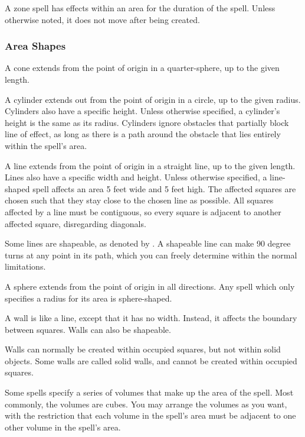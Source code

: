  A zone spell has effects within an area for the duration of the spell. Unless otherwise noted, it does not move after being created.

\subsubsection{Area Shapes}

 A cone extends from the point of origin in a quarter-sphere, up to the given length.

 A cylinder extends out from the point of origin in a circle, up to the given radius. Cylinders also have a specific height. Unless otherwise specified, a cylinder's height is the same as its radius. Cylinders ignore obstacles that partially block line of effect, as long as there is a path around the obstacle that lies entirely within the spell's area.

 A line extends from the point of origin in a straight line, up to the given length. Lines also have a specific width and height. Unless otherwise specified, a line-shaped spell affects an area 5 feet wide and 5 feet high. The affected squares are chosen such that they stay close to the chosen line as possible. All squares affected by a line must be contiguous, so every square is adjacent to another affected square, disregarding diagonals.

\label{Shapeable} Some lines are shapeable, as denoted by \shapeable. A shapeable line can make 90 degree turns at any point in its path, which you can freely determine within the normal limitations.

 A sphere extends from the point of origin in all directions. Any spell which only specifies a radius for its area is sphere-shaped.

 A wall is like a line, except that it has no width. Instead, it affects the boundary between squares. Walls can also be shapeable.

Walls can normally be created within occupied squares, but not within solid objects. Some walls are called solid walls, and cannot be created within occupied squares.

 Some spells specify a series of volumes that make up the area of the spell. Most commonly, the volumes are cubes. You may arrange the volumes as you want, with the restriction that each volume in the spell's area must be adjacent to one other volume in the spell's area.


